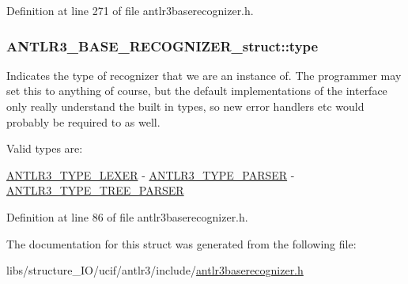 Definition at line 271 of file antlr3baserecognizer.\-h.

\hypertarget{struct_a_n_t_l_r3___b_a_s_e___r_e_c_o_g_n_i_z_e_r__struct_a8e26637c9f4d19ff4bcc9984a04b0ef5}{
\subsubsection[{type}]{ A\-N\-T\-L\-R3\-\_\-\-B\-A\-S\-E\-\_\-\-R\-E\-C\-O\-G\-N\-I\-Z\-E\-R\-\_\-struct\-::type}}\label{struct_a_n_t_l_r3___b_a_s_e___r_e_c_o_g_n_i_z_e_r__struct_a8e26637c9f4d19ff4bcc9984a04b0ef5}
Indicates the type of recognizer that we are an instance of. The programmer may set this to anything of course, but the default implementations of the interface only really understand the built in types, so new error handlers etc would probably be required to as well.

Valid types are\-:


\begin{DoxyItemize}
\item \hyperlink{group___a_n_t_l_r3___b_a_s_e___r_e_c_o_g_n_i_z_e_r_ga63faeec6cee4f885c4b90a6d0cc2f5b4}{A\-N\-T\-L\-R3\-\_\-\-T\-Y\-P\-E\-\_\-\-L\-E\-X\-E\-R} -\/ \hyperlink{group___a_n_t_l_r3___b_a_s_e___r_e_c_o_g_n_i_z_e_r_gafee8a3d7d292291a4cb15619c6bca466}{A\-N\-T\-L\-R3\-\_\-\-T\-Y\-P\-E\-\_\-\-P\-A\-R\-S\-E\-R} -\/ \hyperlink{group___a_n_t_l_r3___b_a_s_e___r_e_c_o_g_n_i_z_e_r_ga3ff933756e4fc6d8fd9a5a8a0d67bb98}{A\-N\-T\-L\-R3\-\_\-\-T\-Y\-P\-E\-\_\-\-T\-R\-E\-E\-\_\-\-P\-A\-R\-S\-E\-R} 
\end{DoxyItemize}

Definition at line 86 of file antlr3baserecognizer.\-h.



The documentation for this struct was generated from the following file\-:\begin{DoxyCompactItemize}
\item 
libs/structure\-\_\-\-I\-O/ucif/antlr3/include/\hyperlink{antlr3baserecognizer_8h}{antlr3baserecognizer.\-h}\end{DoxyCompactItemize}
